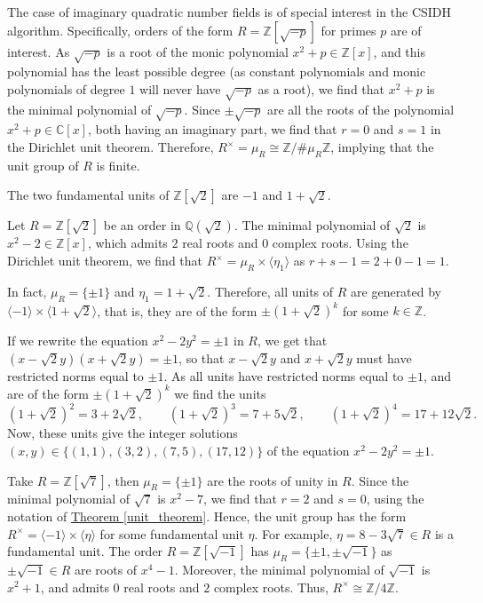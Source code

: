\documentclass[openany, a4paper, 10pt]{book}
\theoremstyle{plain}
\theoremstyle{plain}
\theoremstyle{plain}
\theoremstyle{definition}
\theoremstyle{plain}
\theoremstyle{definition}
\theoremstyle{remark}
\newcommand{\theoref}[1]{\hyperref[#1]{Theorem \ref{#1}}}
\begin{document}
The case of imaginary quadratic number fields is of special interest in the CSIDH algorithm.
Specifically, orders of the form $R=\mathbb Z[\sqrt{-p}]$ for primes $p$ are of interest.
As $\sqrt{-p}$ is a root of the monic polynomial $x^2+p \in \mathbb Z[x]$, and this polynomial has the least possible degree (as constant polynomials and monic polynomials of degree $1$ will never have $\sqrt{-p}$ as a root), we find that $x^2+p$ is the minimal polynomial of $\sqrt{-p}$.
Since $\pm\sqrt{-p}$ are all the roots of the polynomial $x^2+p \in \mathbb C[x]$, both having an imaginary part, we find that $r=0$ and $s=1$ in the Dirichlet unit theorem.
Therefore, $R^\times = \mu_R \cong \mathbb Z/\#\mu_R\mathbb Z$, implying that the unit group of $R$ is finite.

\begin{examplebox}
    The two fundamental units of $\mathbb Z[\sqrt{2}]$ are $-1$ and $1+\sqrt{2}$.

    Let $R = \mathbb Z[\sqrt{2}]$ be an order in $\mathbb Q(\sqrt{2})$.
    The minimal polynomial of $\sqrt{2}$ is $x^2-2 \in \mathbb Z[x]$, which admits $2$ real roots and $0$ complex roots.
    Using the Dirichlet unit theorem, we find that $R^\times = \mu_R \times \langle \eta_1 \rangle$ as $r+s-1 = 2+0-1=1$.

    In fact, $\mu_R = \{\pm 1\}$ and $\eta_1 = 1+\sqrt{2}$.
    Therefore, all units of $R$ are generated by $\langle -1\rangle \times \langle 1+\sqrt{2}\rangle$,
    that is, they are of the form $\pm (1+\sqrt{2})^k$ for some $k \in \mathbb Z$.

    If we rewrite the equation $x^2-2y^2 = \pm 1$ in $R$, we get that $(x - \sqrt{2}y)(x + \sqrt{2}y) = \pm 1$, so that $x-\sqrt{2}y$ and $x+\sqrt{2}y$ must have restricted norms equal to $\pm 1$.
    As all units have restricted norms equal to $\pm 1$, and are of the form $\pm (1+\sqrt{2})^k$ we find the units
    \begin{equation*}
        (1+\sqrt{2})^2 = 3+2\sqrt{2}, \qquad
        (1+\sqrt{2})^3 = 7+5\sqrt{2}, \qquad
        (1+\sqrt{2})^4 = 17+12\sqrt{2}.
    \end{equation*}
    Now, these units give the integer solutions $(x, y) \in \{ (1, 1), (3,2), (7, 5), (17, 12) \}$ of the equation $x^2 - 2y^2 = \pm 1$.

    \tcbline
    Take $R = \mathbb Z[\sqrt{7}]$, then $\mu_R = \{ \pm 1\}$ are the roots of unity in $R$.
    Since the minimal polynomial of $\sqrt{7}$ is $x^2-7$, we find that $r=2$ and $s=0$, using the notation of \theoref{unit_theorem}.
    Hence, the unit group has the form $R^\times = \langle -1 \rangle \times \langle \eta \rangle$ for some fundamental unit $\eta$.
    For example, $\eta = 8-3\sqrt{7} \in R$ is a fundamental unit.
    \tcbline
    The order $R = \mathbb Z[\sqrt{-1}]$ has $\mu_R = \{ \pm 1, \pm \sqrt{-1}\}$ as $\pm\sqrt{-1} \in R$ are roots of $x^4-1$.
    Moreover, the minimal polynomial of $\sqrt{-1}$ is $x^2+1$, and admits $0$ real roots and $2$ complex roots.
    Thus, $R^\times \cong \mathbb Z / 4 \mathbb Z$.
\end{examplebox}
\end{document}

